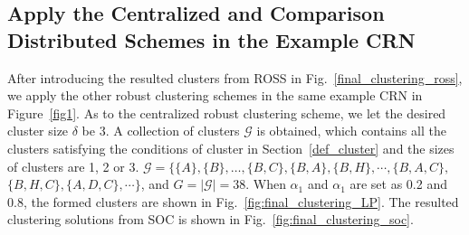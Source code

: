 \documentclass[10pt,journal,compsoc]{IEEEtran}
\theoremstyle{mytheoremstyle}
\theoremstyle{mytheoremstyle}
\theoremstyle{mytheoremstyle}
\begin{document}
\subsection{Apply the Centralized and Comparison Distributed Schemes in the Example CRN}
After introducing the resulted clusters from ROSS in Fig.~\ref{final_clustering_ross}, we apply the other robust clustering schemes in the same example CRN in Figure~\ref{fig1}.
%
As to the centralized robust clustering scheme, we let the desired cluster size $\delta$ be 3.
A collection of clusters $\mathcal{G}$ is obtained, which contains all the clusters satisfying the conditions of cluster in Section~\ref{def_cluster} and the sizes of clusters are 1, 2 or 3. 
$\mathcal{G}=\{\{A\}, \{B\},\dots,\{B,C\},\{B,A\},\{B,H\},\cdots,\{B,A,C\},$\\$\{B,H,C\}, \{A,D,C\},\cdots\}$, and $G = |\mathcal{G}|=38$.
%
When $\alpha_1$ and $\alpha_1$ are set as 0.2 and 0.8, the formed clusters are shown in Fig.~\ref{fig:final_clustering_LP}.
The resulted clustering solutions from SOC is shown in Fig.~\ref{fig:final_clustering_soc}.%
\end{document}
